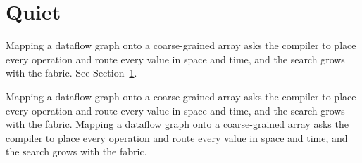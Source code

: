 \documentclass{article}
\begin{document}
\section{Quiet}\label{sec:quiet}
Mapping a dataflow graph onto a coarse-grained array asks the compiler to place every
operation and route  every value in space and time, and the search grows with the fabric. %
See Section~\ref{sec:quiet}.

Mapping a dataflow graph onto a coarse-grained array asks the compiler to place every operation and route every value in space and time, and the search grows with the fabric. Mapping a dataflow graph onto a coarse-grained array asks the compiler to place every operation and route every value in space and time, and the search grows with the fabric.
\end{document}
